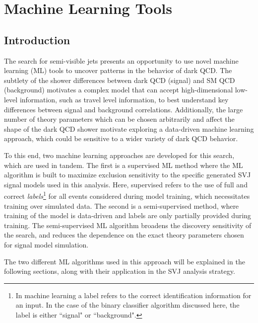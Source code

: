 \chapter{Machine Learning Tools}
\label{ch:ml_tools}

\section{Introduction}
The search for semi-visible jets presents an opportunity to use novel machine learning (ML) tools to uncover patterns in the behavior of dark QCD. The subtlety of the shower differences between dark QCD (signal) and SM QCD (background) motivates a complex model that can accept high-dimensional low-level information, such as travel level information, to best understand key differences between signal and background correlations. Additionally, the large number of theory parameters which can be chosen arbitrarily and affect the shape of the dark QCD shower motivate exploring a data-driven machine learning approach, which could be sensitive to a wider variety of dark QCD behavior. \par

To this end, two machine learning approaches are developed for this search, which are used in tandem. The first is a supervised ML method where the ML algorithm is built to maximize exclusion sensitivity to the specific generated SVJ signal models used in this analysis. Here, supervised refers to the use of full and correct \textit{labels}\footnote{In machine learning a label refers to the correct identification information for an input. In the case of the binary classifier algorithm discussed here, the label is either ``signal" or ``background".} for all events considered during model training, which necessitates training over simulated data. The second is a semi-supervised method, where training of the model is data-driven and labels are only partially provided during training. The semi-supervised ML algorithm broadens the discovery sensitivity of the search, and reduces the dependence on the exact theory parameters chosen for signal model simulation. \par

The two different ML algorithms used in this approach will be explained in the following sections, along with their application in the SVJ analysis strategy.


